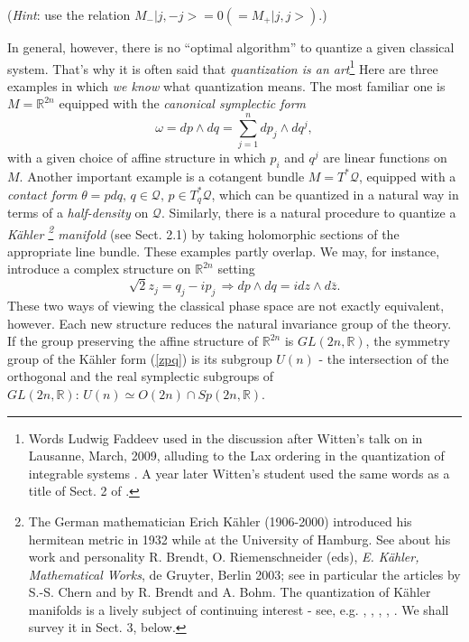 ({\it Hint}: use the relation $M_- |j, -j> = 0 (= M_+|j, j>)$.)

In general, however, there is no ``optimal algorithm'' to quantize a given
classical system. That's why it is often said that {\it quantization is an art}\footnote{Words Ludwig Faddeev used in the discussion after Witten's talk on \cite{GW} in Lausanne, March, 2009, alluding to the Lax ordering in the quantization of integrable systems \cite{F}. A year later Witten's student used the same words as a title of Sect. 2 of \cite{G10}.} Here are three examples in which {\it we know}
what quantization means. The most familiar one is $M = {\mathbb R}^{2n}$
equipped with the {\it canonical symplectic form}
\begin{equation}
\label{dpdq}
\omega = dp\wedge dq = \sum_{j=1}^n dp_j\wedge dq^j,
\end{equation}
with a given choice of affine structure in which $p_i$ and $q^j$ are linear
functions on $M$. Another important example is a cotangent bundle $M = 
T^*{\mathcal Q}$, equipped with a {\it contact form} $\theta = p dq, \, 
q\in{\mathcal Q}, \, p\in T^*_q {\mathcal Q}$, which can be quantized in a natural
 way in terms of a {\it half-density} on ${\mathcal Q}$. Similarly, there is a 
natural procedure to quantize a {\it K\"ahler \footnote{The German mathematician Erich
 K\"ahler (1906-2000) introduced his hermitean metric in 1932 while at the 
University of Hamburg. See about his work and personality R. Brendt, O. 
Riemenschneider (eds), {\it E. K\"ahler, Mathematical Works}, de Gruyter, Berlin
2003; see in particular the articles by S.-S. Chern and by R. Brendt and A.
Bohm. The quantization of K\"ahler manifolds is a lively subject of
continuing interest - see, e.g. \cite{AdPW}, \cite{Hi}, \cite{GW}, \cite{W10},
\cite{G10}. We shall survey it in Sect. 3, below.} manifold} (see Sect. 2.1) 
by taking holomorphic sections of the appropriate line 
bundle. These examples partly overlap. We may, for instance, introduce a 
complex structure on ${\mathbb R}^{2n}$ setting
\begin{equation}
\label{zpq}
\sqrt{2} z_j = q_j - i p_j \, \Rightarrow dp\wedge dq = i dz\wedge d{\bar z}.
\end{equation}
These two ways of viewing the classical phase space are not exactly equivalent,
 however. Each new structure reduces the natural invariance group of the theory.
 If the group preserving the affine structure of ${\mathbb R}^{2n}$ is $GL(2n,
{\mathbb R})$, the symmetry group of the K\"ahler form (\ref{zpq}) is its
subgroup $U(n)$ - the intersection of the orthogonal and the real symplectic 
subgroups of $GL(2n, {\mathbb R}): \, U(n)\simeq O(2n)\cap Sp(2n,{\mathbb R})$.

